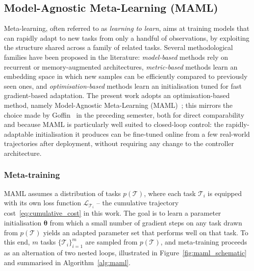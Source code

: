 \documentclass[11pt,a4paper]{article}
\theoremstyle{remark}
\numberwithin{equation}{section}
\begin{document}
\subsection{Model-Agnostic Meta-Learning (MAML)}\label{sec:maml_bg}

Meta-learning, often referred to as \emph{learning to learn}, aims at training
models that can rapidly adapt to new tasks from only a handful of observations,
by exploiting the structure shared across a family of related tasks. Several
methodological families have been proposed in the literature: \emph{model-based}
methods rely on recurrent or memory-augmented architectures, \emph{metric-based}
methods learn an embedding space in which new samples can be efficiently
compared to previously seen ones, and \emph{optimisation-based} methods learn an
initialisation tuned for fast gradient-based adaptation. The present work
adopts an optimisation-based method, namely Model-Agnostic Meta-Learning
(MAML)~\cite{finn2017maml}; this mirrors the choice made by
Goffin~\cite{goffin2026} in the preceding semester, both for direct
comparability and because MAML is particularly well suited to closed-loop
control: the rapidly-adaptable initialisation it produces can be fine-tuned
online from a few real-world trajectories after deployment, without requiring
any change to the controller architecture.

\subsubsection*{Meta-training}

MAML assumes a distribution of tasks $p(\mathcal{T})$, where each task
$\mathcal{T}_i$ is equipped with its own loss function
$\mathcal{L}_{\mathcal{T}_i}$ -- the cumulative trajectory
cost~\eqref{eq:cumulative_cost} in this work. The goal is to learn a parameter
initialisation $\boldsymbol{\theta}$ from which a small number of gradient
steps on any task drawn from $p(\mathcal{T})$ yields an adapted parameter set
that performs well on that task. To this end, $m$ tasks
$\{\mathcal{T}_i\}_{i=1}^{m}$ are sampled from $p(\mathcal{T})$, and
meta-training proceeds as an alternation of two nested loops, illustrated in
Figure~\ref{fig:maml_schematic} and summarised in Algorithm~\ref{alg:maml}.
\end{document}
